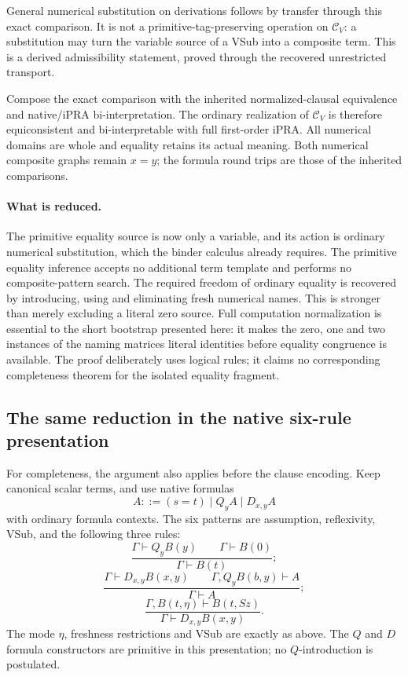 \documentclass[11pt]{article}
\theoremstyle{definition}
\theoremstyle{remark}
\begin{document}
General numerical substitution on derivations follows by transfer
through this exact comparison. It is not a primitive-tag-preserving
operation on $\mathcal C_V$: a substitution may turn the variable
source of a VSub into a composite term. This is a derived admissibility
statement, proved through the recovered unrestricted transport.

Compose the exact comparison with the inherited normalized-clausal
equivalence and native/iPRA bi-interpretation. The ordinary realization
of $\mathcal C_V$ is therefore equiconsistent and bi-interpretable with
full first-order iPRA. All numerical domains are whole and equality
retains its actual meaning. Both numerical composite graphs remain
$x=y$; the formula round trips are those of the inherited comparisons.

\paragraph{What is reduced.}
The primitive equality source is now only a variable, and its action
is ordinary numerical substitution, which the binder calculus already
requires. The primitive equality inference accepts no additional term
template and performs no composite-pattern search. The required freedom
of ordinary equality is recovered by introducing, using and eliminating
fresh numerical names. This is stronger than merely excluding a literal
zero source. Full computation normalization is essential to the short
bootstrap presented here: it makes the zero, one and two instances of
the naming matrices literal identities before equality congruence is
available. The proof deliberately uses logical rules; it claims no
corresponding completeness theorem for the isolated equality fragment.


\subsection{The same reduction in the native six-rule presentation}

For completeness, the argument also applies before the clause
encoding. Keep canonical scalar terms, and use native formulas
\[
 A::=(s=t)\mid Q_yA\mid D_{x,y}A
\]
with ordinary formula contexts. The six patterns are assumption,
reflexivity, VSub, and the following three rules:
\[
 \frac{\Gamma\vdash Q_yB(y)\qquad\Gamma\vdash B(0)}
      {\Gamma\vdash B(t)};\tag{$Q$E}
\]
\[
 \frac{\Gamma\vdash D_{x,y}B(x,y)\qquad
       \Gamma,Q_yB(b,y)\vdash A}
      {\Gamma\vdash A};\tag{$D$E}
\]
\[
 \frac{\Gamma,B(t,\eta)\vdash B(t,Sz)}
      {\Gamma\vdash D_{x,y}B(x,y)}.\tag{$D$I}
\]
The mode $\eta$, freshness restrictions and VSub are exactly as
above. The $Q$ and $D$ formula constructors are primitive in this
presentation; no $Q$-introduction is postulated.
\end{document}
